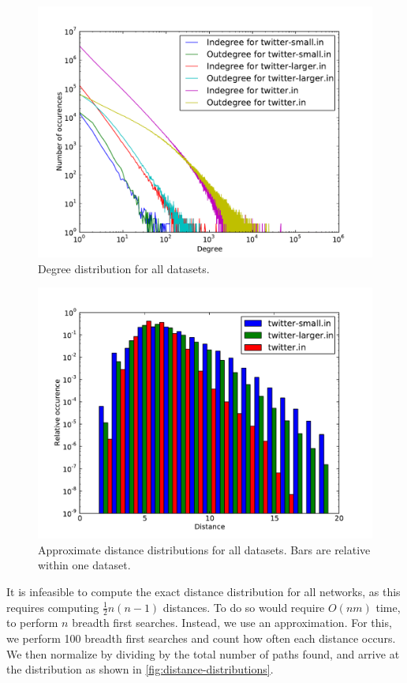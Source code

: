 \documentclass[a4paper,10pt,hidelinks]{article}
\begin{document}
\begin{figure}
	\centering
	\includegraphics[scale=0.8]{degree-distributions.pdf}
	\caption{Degree distribution for all datasets.}
\end{figure}

\begin{figure}
	\centering
	\includegraphics[scale=0.8]{distance-distribution}
	\caption{Approximate distance distributions for all datasets. Bars are relative within one dataset.}
	\label{fig:distance-distributions}
\end{figure}

It is infeasible to compute the exact distance distribution for all networks, as this requires computing $\frac{1}{2} n (n-1)$ distances. To do so would require $O(nm)$ time, to perform $n$ breadth first searches. Instead, we use an approximation. For this, we perform 100 breadth first searches and count how often each distance occurs. We then normalize by dividing by the total number of paths found, and arrive at the distribution as shown in \autoref{fig:distance-distributions}.
\end{document}
